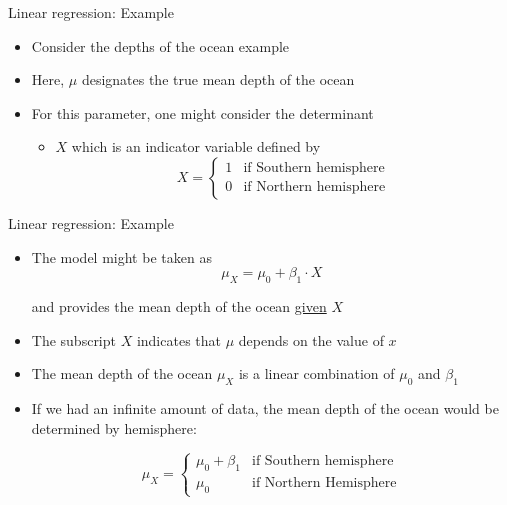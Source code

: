 \documentclass[10pt,handout]{beamer}\usepackage[]{graphicx}\usepackage[]{color}
\begin{document}
\begin{frame}{Linear regression: Example}
	
	\begin{itemize}
		\setlength\itemsep{2em}
		\item Consider the depths of the ocean example
		\item Here, $\mu$ designates the true mean depth of the ocean 
		\item For this parameter, one might consider the determinant 
		\begin{itemize}
			\item $X$ which is an indicator variable defined by			
			$$
			X = \begin{cases}
			1 & \textrm{if Southern hemisphere}\\
			0 & \textrm{if Northern hemisphere}
			\end{cases}
			$$
			
		\end{itemize} 
		
	\end{itemize}
	
\end{frame}



\begin{frame}{Linear regression: Example}
	
	\begin{itemize}
		\setlength\itemsep{1.7em}
		\item The model might be taken as 
		$$
		\mu_X = \mu_0 + \beta_1 \cdot X 
		$$
		
		and provides the mean depth of the ocean \underline{given} $X$ 
		
		\item The subscript $X$ indicates that $\mu$ depends on the value of $x$
		
		\item The mean depth of the ocean $\mu_X$ is a linear combination of $\mu_0$ and $\beta_1$ 
		
			
		\item If we had an infinite amount of data, the mean depth of the ocean would be determined by hemisphere:
		
		$$
		\mu_X = \begin{cases}
		\mu_0 + \beta_1  &  \textrm{if Southern hemisphere}\\
		\mu_0  &  \textrm{if Northern Hemisphere}
		\end{cases}
		$$
		
	\end{itemize}
	
\end{frame}
\end{document}
